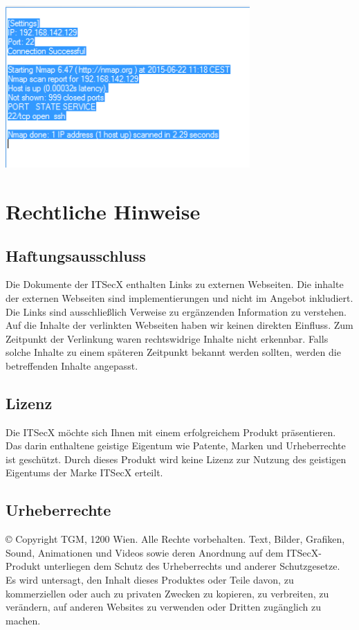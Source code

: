 \documentclass[11pt]{article} %
\begin{document}
\begin{center}
\includegraphics[width=0.7\textwidth]{afternmap}\\
\end{center}
\pagebreak
\section{Rechtliche Hinweise}

\subsection{Haftungsausschluss}
Die Dokumente der ITSecX enthalten Links zu externen Webseiten. 
Die inhalte der externen Webseiten sind implementierungen und nicht
im Angebot inkludiert. 
Die Links sind ausschließlich Verweise zu ergänzenden Information
zu verstehen. 
Auf die Inhalte der verlinkten Webseiten haben wir keinen direkten
Einfluss. 
Zum Zeitpunkt der Verlinkung waren rechtswidrige 
Inhalte nicht erkennbar. 
Falls solche Inhalte zu einem späteren Zeitpunkt bekannt werden sollten,
werden die betreffenden Inhalte angepasst.

\subsection{Lizenz}
Die ITSecX möchte sich Ihnen mit einem erfolgreichem Produkt 
präsentieren. 
Das darin enthaltene geistige Eigentum wie Patente, 
Marken und Urheberrechte ist geschützt.
Durch dieses Produkt wird keine Lizenz zur Nutzung des 
geistigen Eigentums der Marke ITSecX erteilt.

\subsection{Urheberrechte}


© Copyright TGM, 1200 Wien. Alle Rechte vorbehalten. 
Text, Bilder, Grafiken, Sound, Animationen und Videos sowie deren 
Anordnung auf dem ITSecX-Produkt unterliegen dem Schutz des Urheberrechts 
und anderer Schutzgesetze.
\\
Es wird untersagt, den Inhalt dieses Produktes oder Teile davon, 
zu kommerziellen oder auch zu privaten Zwecken zu kopieren, 
zu verbreiten, zu verändern, auf anderen Websites zu verwenden 
oder Dritten zugänglich zu machen.
\end{document}
